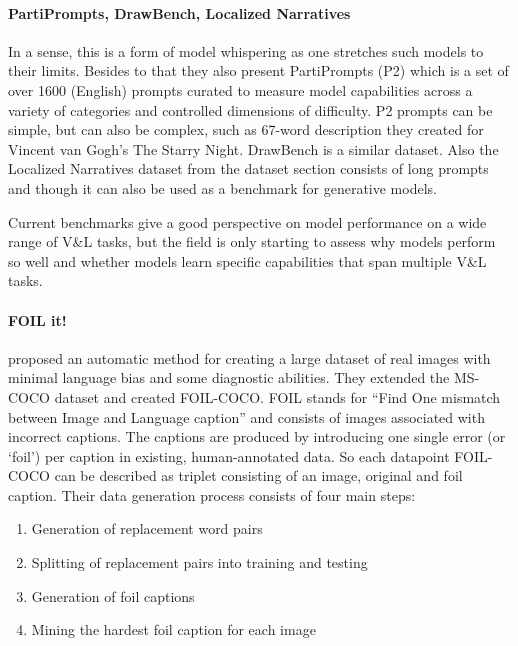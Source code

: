 \documentclass[
]{krantz}
\providecommand{\tightlist}{%
  \setlength{\itemsep}{0pt}\setlength{\parskip}{0pt}}
\begin{document}
\hypertarget{partiprompts-drawbench-localized-narratives}{%
\paragraph{PartiPrompts, DrawBench, Localized Narratives}\label{partiprompts-drawbench-localized-narratives}}

In a sense, this is a form of model whispering as one stretches such models to their limits. Besides to that they also present PartiPrompts (P2) which is a set of over 1600 (English) prompts curated to measure model capabilities across a variety of categories and controlled dimensions of difficulty. P2 prompts can be simple, but can also be complex, such as 67-word description they created for Vincent van Gogh's The Starry Night. DrawBench is a similar dataset. Also the Localized Narratives dataset from the dataset section consists of long prompts and though it can also be used as a benchmark for generative models.

Current benchmarks give a good perspective on model performance on a wide range of V\&L tasks, but the field is only starting to assess why models perform so well and whether models learn specific capabilities that span multiple V\&L tasks.

\hypertarget{foil-it}{%
\paragraph{FOIL it!}\label{foil-it}}

\citet{shekhar2017foil} proposed an automatic method for creating a large dataset of real images with minimal language bias and some diagnostic abilities. They extended the MS-COCO dataset and created FOIL-COCO. FOIL stands for ``Find One mismatch between Image and Language caption'' and consists of images associated with incorrect captions. The captions are produced by introducing one single error (or `foil') per caption in existing, human-annotated data. So each datapoint FOIL-COCO can be described as triplet consisting of an image, original and foil caption. Their data generation process consists of four main steps:

\begin{enumerate}
\def\labelenumi{\arabic{enumi}.}
\tightlist
\item
  Generation of replacement word pairs
\item
  Splitting of replacement pairs into training and testing
\item
  Generation of foil captions
\item
  Mining the hardest foil caption for each image
\end{enumerate}
\end{document}
